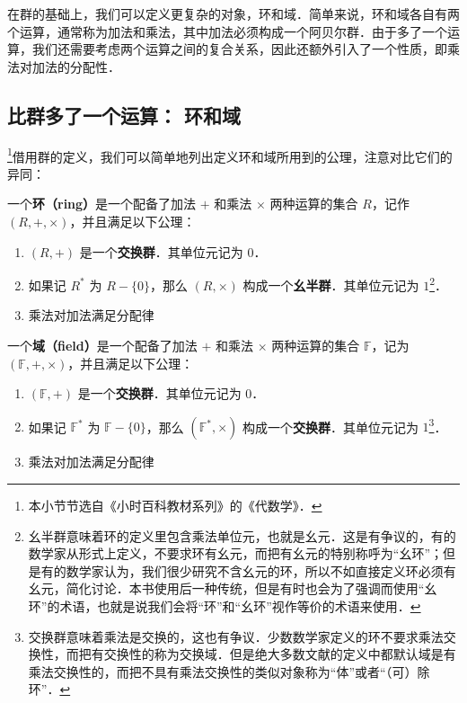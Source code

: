 

在群的基础上，我们可以定义更复杂的对象，环和域．简单来说，环和域各自有两个运算，通常称为加法和乘法，其中加法必须构成一个阿贝尔群．由于多了一个运算，我们还需要考虑两个运算之间的复合关系，因此还额外引入了一个性质，即乘法对加法的分配性．

\subsection{比群多了一个运算： 环和域}

\footnote{本小节节选自《小时百科教材系列》的《代数学》．}借用群的定义，我们可以简单地列出定义环和域所用到的公理，注意对比它们的异同：

\begin{definition}{}
一个\textbf{环（ring）}是一个配备了加法 $+$ 和乘法 $\times$ 两种运算的集合 $R$，记作 $(R, +, \times)$，并且满足以下公理：
\begin{enumerate}
    \item $(R, +)$ 是一个\textbf{交换群}．其单位元记为 $0$．
    \item 如果记 $R^*$ 为 $R-\{0\}$，那么 $(R, \times)$ 构成一个\textbf{幺半群}．其单位元记为 $1$\footnote{幺半群意味着环的定义里包含乘法单位元，也就是幺元．这是有争议的，有的数学家从形式上定义，不要求环有幺元，而把有幺元的特别称呼为“幺环”；但是有的数学家认为，我们很少研究不含幺元的环，所以不如直接定义环必须有幺元，简化讨论．本书使用后一种传统，但是有时也会为了强调而使用“幺环”的术语，也就是说我们会将“环”和“幺环”视作等价的术语来使用．}．
    \item 乘法对加法满足分配律
\end{enumerate}
\end{definition}

\begin{definition}{}
一个\textbf{域（field）}是一个配备了加法 $+$ 和乘法 $\times$ 两种运算的集合 $\mathbb{F}$，记为 $(\mathbb{F}, +, \times)$，并且满足以下公理：

\begin{enumerate}
    \item $(\mathbb{F}, +)$ 是一个\textbf{交换群}．其单位元记为 $0$．
    \item 如果记 $\mathbb{F}^*$ 为 $\mathbb{F}-\{0\}$，那么 $(\mathbb{F}^*, \times)$ 构成一个\textbf{交换群}．其单位元记为 $1$\footnote{交换群意味着乘法是交换的，这也有争议．少数数学家定义的环不要求乘法交换性，而把有交换性的称为交换域．但是绝大多数文献的定义中都默认域是有乘法交换性的，而把不具有乘法交换性的类似对象称为“体”或者“（可）除环”．}．
    \item 乘法对加法满足分配律
\end{enumerate}
\end{definition}


